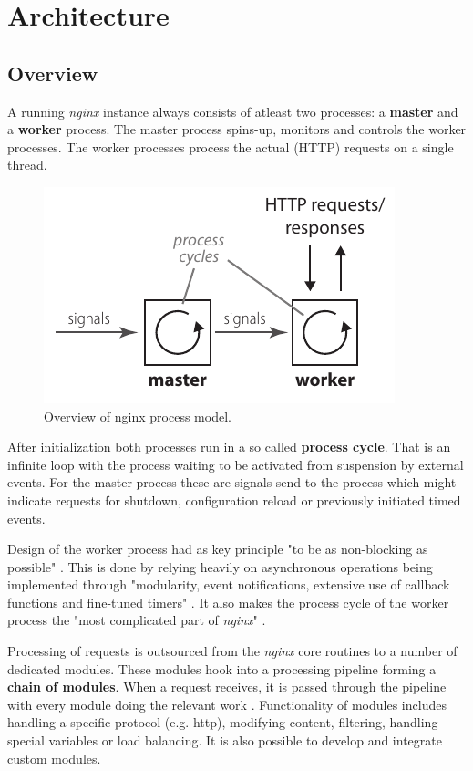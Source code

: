 \section{Architecture}
\label{sec:nginx-arch}

\subsection{Overview}

A running \textit{nginx} instance always consists of atleast two processes: a \textbf{master} and a \textbf{worker} process. The master process spins-up, monitors and controls the worker processes. The worker processes process the actual (HTTP) requests on a single thread.

\begin{figure}
	\centering
	\includegraphics[scale=1]{images/nginx-overview.pdf}
	\caption{Overview of nginx process model.}
	\label{fig:nginx-overview}
\end{figure}

After initialization both processes run in a so called \textbf{process cycle}. That is an infinite loop with the process waiting to be activated from suspension by external events. For the master process these are signals send to the process which might indicate requests for shutdown, configuration reload or previously initiated timed events.

Design of the worker process had as key principle "to be as non-blocking as possible" \cite{aosa}. This is done by relying heavily on asynchronous operations being implemented through "modularity, event notifications, extensive use of callback functions and fine-tuned timers" \cite{aosa}. It also makes the process cycle of the worker process the "most complicated part of \textit{nginx}" \cite{aosa}.

Processing of requests is outsourced from the \textit{nginx} core routines to a number of dedicated modules. These modules hook into a processing pipeline forming a \textbf{chain of modules}. When a request receives, it is passed through the pipeline with every module doing the relevant work \cite{aosa}. Functionality of modules includes handling a specific protocol (e.g. \gls{http}), modifying content, filtering, handling special variables or load balancing. It is also possible to develop and integrate custom modules.

